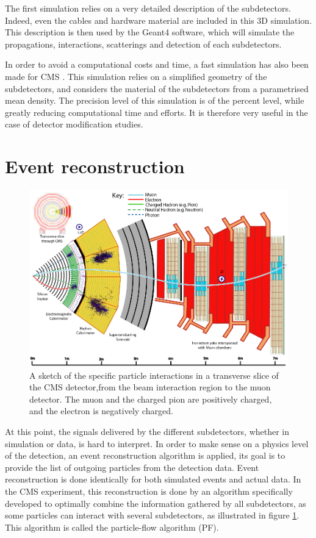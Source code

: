 The first simulation relies on a very detailed description of the subdetectors. Indeed, even the cables and hardware material are included in this 3D simulation. This description is then used by the Geant4 software, which will simulate the propagations, interactions, scatterings and detection of each subdetectors.

In order to avoid a computational costs and time, a fast simulation has also been made for CMS \cite{Abdullin_2011}. This simulation relies on a simplified geometry of the subdetectors, and considers the material of the subdetectors from a parametrised mean density. The precision level of this simulation is of the percent level, while greatly reducing computational time and efforts. It is therefore very useful in the case of detector modification studies.

\section{Event reconstruction}
\label{sec:cms_physics_event_reconstruction}

\begin{figure}
    \centering
    \includegraphics[width=\textwidth]{Images/pflow_illustration_2.png}
    \caption{A sketch of the specific particle interactions in a transverse slice of the CMS detector,from the beam interaction region to the muon detector.  The muon and the charged pion are positively charged, and the electron is negatively charged.}
    \label{fig:pflow_illustration}
\end{figure}

At this point, the signals delivered by the different subdetectors, whether in simulation or data, is hard to interpret. In order to make sense on a physics level of the detection, an event reconstruction algorithm is applied, its goal is to provide the list of outgoing particles from the detection data. Event reconstruction is done identically for both simulated events and actual data. In the CMS experiment, this reconstruction is done by an algorithm specifically developed to optimally combine the information gathered by all subdetectors, as some particles can interact with several subdetectors, as illustrated in figure \ref{fig:pflow_illustration}. This algorithm is called the particle-flow algorithm (PF). 

